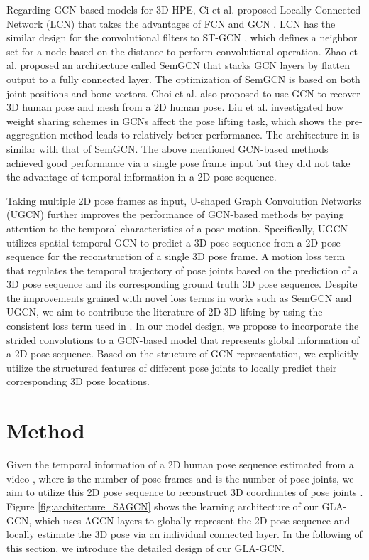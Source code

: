\documentclass[10pt,twocolumn,letterpaper]{article}
\begin{document}
Regarding GCN-based models for 3D HPE, Ci et al.  \cite{RN029} proposed Locally Connected Network (LCN) that takes the advantages of FCN \cite{RN011} and GCN \cite{RN030}. LCN has the similar design for the convolutional filters to ST-GCN \cite{RN026}, which defines a neighbor set for a node based on the distance to perform convolutional operation. Zhao et al. \cite{RN018} proposed an architecture called SemGCN that stacks GCN layers by flatten output to a fully connected layer. The optimization of SemGCN is based on both joint positions and bone vectors. Choi et al. \cite{RN020} also proposed to use GCN to recover 3D human pose and mesh from a 2D human pose. Liu et al. \cite{RN031} investigated how weight sharing schemes in GCNs affect the pose lifting task, which shows the pre-aggregation method leads to relatively better performance. The architecture in \cite{RN031} is similar with that of SemGCN. The above mentioned GCN-based methods achieved good performance via a single pose frame input but they did not take the advantage of temporal information in a 2D pose sequence. 

Taking multiple 2D pose frames as input, U-shaped Graph Convolution Networks (UGCN) \cite{RN014, hu2021conditional} further improves the performance of GCN-based methods by paying attention to the temporal characteristics of a pose motion. Specifically, UGCN utilizes spatial temporal GCN \cite{RN026} to predict a 3D pose sequence from a 2D pose sequence for the reconstruction of a single 3D pose frame. A motion loss term that regulates the temporal trajectory of pose joints based on the prediction of a 3D pose sequence and its corresponding ground truth 3D pose sequence. Despite the improvements grained with novel loss terms in works such as SemGCN and UGCN, we aim to contribute the literature of 2D-3D lifting by using the consistent loss term used in \cite{RN012,RN013}. In our model design, we propose to incorporate the strided convolutions to a GCN-based model that represents global information of a 2D pose sequence. Based on the structure of GCN representation, we explicitly utilize the structured features of different pose joints to locally predict their corresponding 3D pose locations. 

\section{Method}
Given the temporal information of a 2D human pose sequence estimated from a video , where  is the number of pose frames and  is the number of pose joints, we aim to utilize this 2D pose sequence  to reconstruct 3D coordinates of pose joints . Figure \ref{fig:architecture_SAGCN} shows the learning architecture of our GLA-GCN, which uses AGCN layers to globally represent the 2D pose sequence and locally estimate the 3D pose via an individual connected layer. In the following of this section, we introduce the detailed design of our GLA-GCN.
\end{document}
